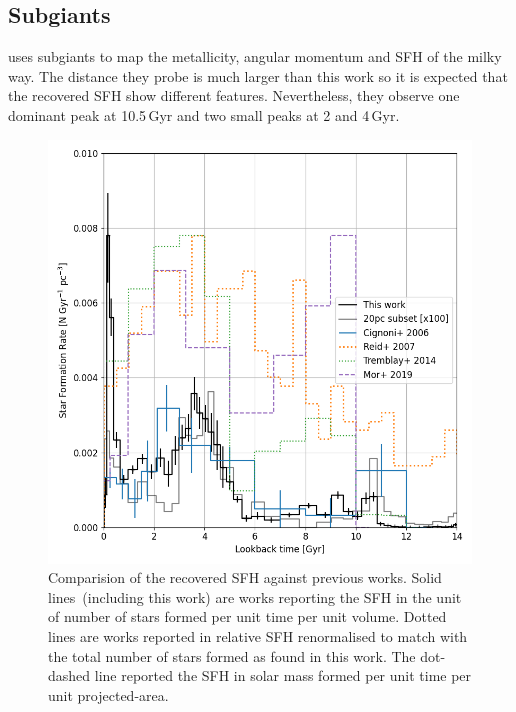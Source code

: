 \documentclass[fleqn,usenatbib]{mnras}
\begin{document}
\subsection{Subgiants}
\citet{2022Natur.603..599X} uses subgiants to map the metallicity, angular
momentum and SFH of the milky way. The distance they probe is much larger
than this work so it is expected that the recovered SFH show different
features. Nevertheless, they observe one dominant peak at 10.5\,Gyr and two
small peaks at 2 and 4\,Gyr.


\begin{figure}
  \includegraphics[width=\columnwidth]{figures/fig_06_compare_sfh.png}
  \caption{Comparision of the recovered SFH against previous works.
  Solid lines~(including this work)
  are works reporting the SFH in the unit of number of stars formed per
  unit time per unit volume. Dotted lines are works reported
  in relative SFH renormalised to match with the total number of stars formed
  as found in this work. The dot-dashed line reported the SFH in solar mass
  formed per unit time per unit projected-area.}
  \label{fig:comparison}
\end{figure}

\end{document}
